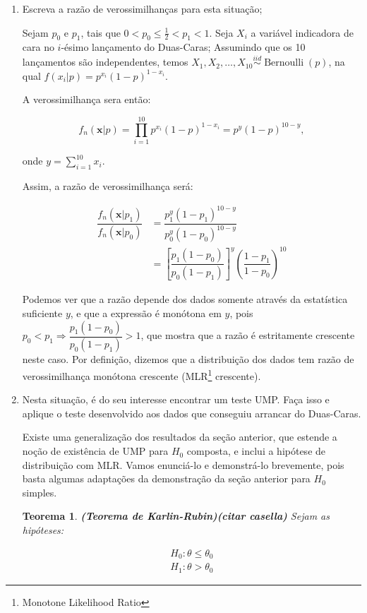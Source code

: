 \documentclass[a4paper,10pt, notitlepage]{report}
\newtheorem{teo}{Teorema}
\newcommand{\gt}{>}%
\newcommand{\pow}{^}%
\newcommand{\bx}{\boldsymbol{x}} %
\newcommand{\op}{\operatorname}
\begin{document}
	\begin{enumerate}
		\item Escreva a razão de verossimilhanças para esta situação;
		
		Sejam $p_0$ e $p_1$, tais que $0<p_0\leq \frac{1}{2}<p_1<1$. Seja $X_i$ a variável indicadora de cara no $i$-ésimo lançamento do Duas-Caras; Assumindo que os 10 lançamentos são independentes, temos $X_1,X_2,\ldots,X_{10}\stackrel{iid}{\sim} \op{Bernoulli}(p)$, na qual $f(x_i|p)=p\pow{x_i}(1-p)\pow{1-x_i}$.
		
		A verossimilhança sera então:
		
		$$f_n(\bx|p)=\prod_{i=1}^{10}p\pow{x_i}(1-p)\pow{1-x_i}=p\pow{y}(1-p)\pow{10-y},$$
		
		onde $\displaystyle y=\sum_{i=1}^{10}x_i$.
		
		Assim, a razão de verossimilhança será:
		
		\begin{align*}
			\dfrac{f_n(\bx|p_1)}{f_n(\bx|p_0)}&=\dfrac{p_1\pow{y}(1-p_1)\pow{10-y}}{p_0\pow{y}(1-p_0)\pow{10-y}}\\
			&=\left[\dfrac{p_1(1-p_0)}{p_0(1-p_1)}\right]\pow y\left(\dfrac{1-p_1}{1-p_0}\right)\pow{10}
		\end{align*}
		
		Podemos ver que a razão depende dos dados somente através da estatística suficiente $y$, e que a expressão é monótona em $y$, pois $p_0<p_1\Rightarrow \dfrac{p_1(1-p_0)}{p_0(1-p_1)}>1$, que mostra que a razão é estritamente crescente neste caso. Por definição, dizemos que a distribuição dos dados tem razão de verossimilhança monótona crescente (MLR\footnote{Monotone Likelihood Ratio} crescente).
		
		\item Nesta situação, é do seu interesse encontrar um teste UMP.
		Faça isso e aplique o teste desenvolvido aos dados que conseguiu arrancar do Duas-Caras.
		
		Existe uma generalização dos resultados da seção anterior, que estende a noção de existência de UMP para $H_0$ composta, e inclui a hipótese de distribuição com MLR. Vamos enunciá-lo e demonstrá-lo brevemente, pois basta algumas adaptações da demonstração da seção anterior para $H_0$ simples.
		
		\begin{teo}
			\textbf{(Teorema de Karlin-Rubin)(citar casella)} Sejam as hipóteses:
			
			\begin{align*}
				H_0:\theta\leq\theta_0\\
				H_1:\theta\gt\theta_0
			\end{align*}
			

\end{teo}
\end{enumerate}
\end{document}
